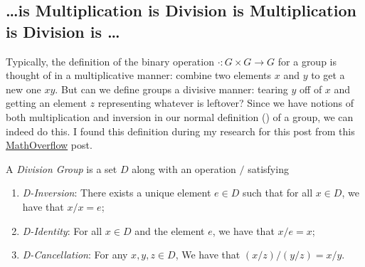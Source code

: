 \documentclass{article}
\begin{document}
\subsection*{\ldots is Multiplication is Division is Multiplication is Division is \ldots}

Typically, the definition of the binary operation $\cdot\colon G \times G \to G$ for a group is thought of in a multiplicative manner: combine two elements $x$ and $y$ to get a new one $xy$.
But can we define groups a divisive manner: tearing $y$ off of $x$ and getting an element $z$ representing whatever is leftover?
Since we have notions of both multiplication and inversion in our normal definition () of a group, we can indeed do this.
I found this definition during my research for this post from this \href{https://mathoverflow.net/questions/277938/wieners-axiomatization-of-the-group-law-based-on-division}{MathOverflow} post.

\begin{defn}\label{defn:div-grp}
  A \emph{Division Group} is a set $D$ along with an operation $/$ satisfying
  \begin{enumerate}
  \item \emph{D-Inversion}: There exists a unique element $e \in D$ such that for all $x \in D$, we have that $x / x = e$;
  \item \emph{D-Identity}: For all $x \in D$ and the element $e$, we have that $x / e = x$;
  \item \emph{D-Cancellation}: For any $x, y, z \in D$, We have that $(x / z) / (y / z) = x / y$.
  \end{enumerate}
\end{defn}
\end{document}
